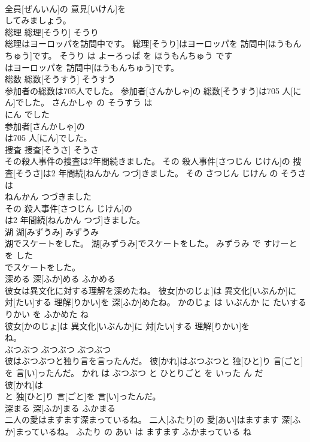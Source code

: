 \documentclass[8pt]{extreport}
\begin{document}
\begin{CJK}{UTF8}{min}
\\	全員[ぜんいん]の 意見[いけん]を
\\	してみましょう。			
\\	総理	総理[そうり]	そうり	
\\	総理はヨーロッパを訪問中です。	総理[そうり]はヨーロッパを 訪問中[ほうもんちゅう]です。	そうり は よーろっぱ を ほうもんちゅう です	
\\	はヨーロッパを 訪問中[ほうもんちゅう]です。			
\\	総数	総数[そうすう]	そうすう	
\\	参加者の総数は705人でした。	参加者[さんかしゃ]の 総数[そうすう]は705 人[にん]でした。	さんかしゃ の そうすう は 
\\	にん でした	
\\	参加者[さんかしゃ]の
\\	は705 人[にん]でした。			
\\	捜査	捜査[そうさ]	そうさ	
\\	その殺人事件の捜査は2年間続きました。	その 殺人事件[さつじん じけん]の 捜査[そうさ]は2 年間続[ねんかん つづ]きました。	その さつじん じけん の そうさ は 
\\	ねんかん つづきました	
\\	その 殺人事件[さつじん じけん]の
\\	は2 年間続[ねんかん つづ]きました。			
\\	湖	湖[みずうみ]	みずうみ	
\\	湖でスケートをした。	湖[みずうみ]でスケートをした。	みずうみ で すけーと を した	
\\	でスケートをした。			
\\	深める	深[ふか]める	ふかめる	
\\	彼女は異文化に対する理解を深めたね。	彼女[かのじょ]は 異文化[いぶんか]に 対[たい]する 理解[りかい]を 深[ふか]めたね。	かのじょ は いぶんか に たいする りかい を ふかめた ね	
\\	彼女[かのじょ]は 異文化[いぶんか]に 対[たい]する 理解[りかい]を
\\	ね。			
\\	ぶつぶつ	ぶつぶつ	ぶつぶつ	
\\	彼はぶつぶつと独り言を言ったんだ。	彼[かれ]はぶつぶつと 独[ひと]り 言[ごと]を 言[い]ったんだ。	かれ は ぶつぶつ と ひとりごと を いった ん だ	
\\	彼[かれ]は
\\	と 独[ひと]り 言[ごと]を 言[い]ったんだ。			
\\	深まる	深[ふか]まる	ふかまる	
\\	二人の愛はますます深まっているね。	二人[ふたり]の 愛[あい]はますます 深[ふか]まっているね。	ふたり の あい は ますます ふかまっている ね	

\end{CJK}
\end{document}
